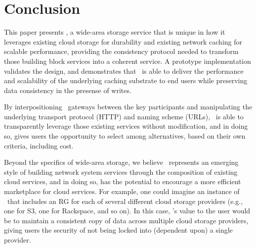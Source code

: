\section{Conclusion}
\label{sec:conclusion}

This paper presents \Syndicate, a wide-area storage service that is
unique in how it leverages existing cloud storage for durability and
existing network caching for scalable performance, providing the
consistency protocol needed to transform those building block services
into a coherent service. A prototype implementation validates the
design, and demonstrates that \Syndicate\ is able to deliver the
performance and scalability of the underlying caching substrate to end
users while preserving data consistency in the presense of writes.

By interpositioning \Syndicate\ gateways between the key participants
and manipulating the underlying transport protocol (HTTP) and naming
scheme (URLs), \Syndicate\ is able to transparently leverage those
existing services without modification, and in doing so, gives users
the opportunity to select among alternatives, based on their own
criteria, including cost.

Beyond the specifics of wide-area storage, we believe \Syndicate\ represents an emerging style of building network system services
through the composition of existing cloud services, and in doing so,
has the potential to encourage a more efficient marketplace for cloud
services. For example, one could imagine an instance of \Syndicate\ that
includes an RG for each of several different cloud storage providers
(e.g., one for S3, one for Rackspace, and so on). In this case,
\Syndicate's value to the user would be to maintain a consistent copy
of data across multiple cloud storage providers, giving users the
security of not being locked into (dependent upon) a single provider.


